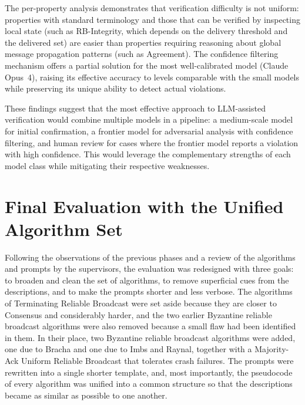 The per-property analysis demonstrates that verification difficulty is not uniform: properties with standard terminology and those that can be verified by inspecting local state (such as RB-Integrity, which depends on the delivery threshold and the delivered set) are easier than properties requiring reasoning about global message propagation patterns (such as Agreement). The confidence filtering mechanism offers a partial solution for the most well-calibrated model (Claude Opus~4), raising its effective accuracy to levels comparable with the small models while preserving its unique ability to detect actual violations.

These findings suggest that the most effective approach to LLM-assisted verification would combine multiple models in a pipeline: a medium-scale model for initial confirmation, a frontier model for adversarial analysis with confidence filtering, and human review for cases where the frontier model reports a violation with high confidence. This would leverage the complementary strengths of each model class while mitigating their respective weaknesses.

\section{Final Evaluation with the Unified Algorithm Set}

Following the observations of the previous phases and a review of the algorithms and prompts by the supervisors, the evaluation was redesigned with three goals: to broaden and clean the set of algorithms, to remove superficial cues from the descriptions, and to make the prompts shorter and less verbose. The algorithms of Terminating Reliable Broadcast were set aside because they are closer to Consensus and considerably harder, and the two earlier Byzantine reliable broadcast algorithms were also removed because a small flaw had been identified in them. In their place, two Byzantine reliable broadcast algorithms were added, one due to Bracha and one due to Imbs and Raynal, together with a Majority-Ack Uniform Reliable Broadcast that tolerates crash failures. The prompts were rewritten into a single shorter template, and, most importantly, the pseudocode of every algorithm was unified into a common structure so that the descriptions became as similar as possible to one another.

